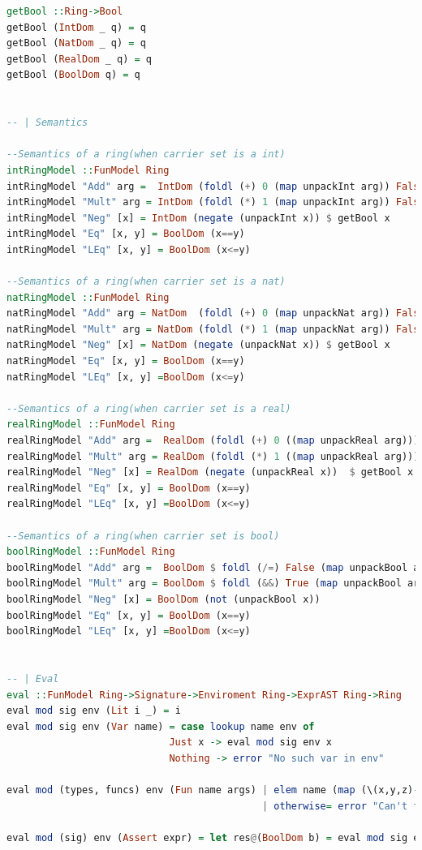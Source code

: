 \documentclass{article}
\begin{document}
\begin{lstlisting}[language=Haskell]
getBool ::Ring->Bool
getBool (IntDom _ q) = q
getBool (NatDom _ q) = q
getBool (RealDom _ q) = q
getBool (BoolDom q) = q


-- | Semantics 

--Semantics of a ring(when carrier set is a int)
intRingModel ::FunModel Ring
intRingModel "Add" arg =  IntDom (foldl (+) 0 (map unpackInt arg)) False
intRingModel "Mult" arg = IntDom (foldl (*) 1 (map unpackInt arg)) False
intRingModel "Neg" [x] = IntDom (negate (unpackInt x)) $ getBool x
intRingModel "Eq" [x, y] = BoolDom (x==y)
intRingModel "LEq" [x, y] = BoolDom (x<=y)

--Semantics of a ring(when carrier set is a nat)
natRingModel ::FunModel Ring
natRingModel "Add" arg = NatDom  (foldl (+) 0 (map unpackNat arg)) False
natRingModel "Mult" arg = NatDom (foldl (*) 1 (map unpackNat arg)) False
natRingModel "Neg" [x] = NatDom (negate (unpackNat x)) $ getBool x
natRingModel "Eq" [x, y] = BoolDom (x==y)
natRingModel "LEq" [x, y] =BoolDom (x<=y)

--Semantics of a ring(when carrier set is a real)
realRingModel ::FunModel Ring
realRingModel "Add" arg =  RealDom (foldl (+) 0 ((map unpackReal arg))) False
realRingModel "Mult" arg = RealDom (foldl (*) 1 ((map unpackReal arg))) False
realRingModel "Neg" [x] = RealDom (negate (unpackReal x))  $ getBool x
realRingModel "Eq" [x, y] = BoolDom (x==y)
realRingModel "LEq" [x, y] =BoolDom (x<=y)

--Semantics of a ring(when carrier set is bool)
boolRingModel ::FunModel Ring
boolRingModel "Add" arg =  BoolDom $ foldl (/=) False (map unpackBool arg)
boolRingModel "Mult" arg = BoolDom $ foldl (&&) True (map unpackBool arg)
boolRingModel "Neg" [x] = BoolDom (not (unpackBool x))
boolRingModel "Eq" [x, y] = BoolDom (x==y)
boolRingModel "LEq" [x, y] =BoolDom (x<=y)


-- | Eval
eval ::FunModel Ring->Signature->Enviroment Ring->ExprAST Ring->Ring
eval mod sig env (Lit i _) = i
eval mod sig env (Var name) = case lookup name env of
                            Just x -> eval mod sig env x
                            Nothing -> error "No such var in env"

eval mod (types, funcs) env (Fun name args) | elem name (map (\(x,y,z)->x) funcs) =mod name (map (eval mod (types, funcs) env) args)
                                            | otherwise= error "Can't find function in signature"

eval mod (sig) env (Assert expr) = let res@(BoolDom b) = eval mod sig env expr in if b then res else error $"Assert did not hold"++ (show expr)



\end{lstlisting}
\end{document}

